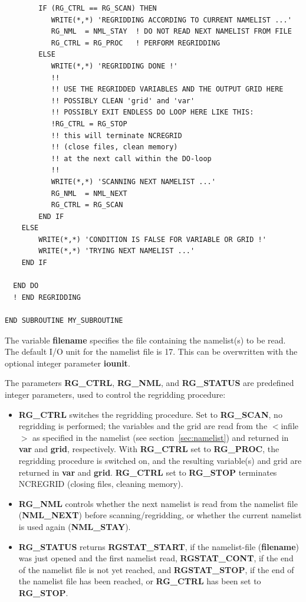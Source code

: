 \documentclass[12pt, a4paper]{article}
\begin{document}
\begin{verbatim}
        IF (RG_CTRL == RG_SCAN) THEN
           WRITE(*,*) 'REGRIDDING ACCORDING TO CURRENT NAMELIST ...'
           RG_NML  = NML_STAY  ! DO NOT READ NEXT NAMELIST FROM FILE
           RG_CTRL = RG_PROC   ! PERFORM REGRIDDING
        ELSE
           WRITE(*,*) 'REGRIDDING DONE !'
           !!
           !! USE THE REGRIDDED VARIABLES AND THE OUTPUT GRID HERE
           !! POSSIBLY CLEAN 'grid' and 'var'
           !! POSSIBLY EXIT ENDLESS DO LOOP HERE LIKE THIS:
           !RG_CTRL = RG_STOP
           !! this will terminate NCREGRID
           !! (close files, clean memory)
           !! at the next call within the DO-loop
           !!
           WRITE(*,*) 'SCANNING NEXT NAMELIST ...'
           RG_NML  = NML_NEXT
           RG_CTRL = RG_SCAN
        END IF
    ELSE
        WRITE(*,*) 'CONDITION IS FALSE FOR VARIABLE OR GRID !'
        WRITE(*,*) 'TRYING NEXT NAMELIST ...'
    END IF

  END DO
  ! END REGRIDDING

END SUBROUTINE MY_SUBROUTINE
\end{verbatim}
%

The variable {\bf filename} specifies the file containing the namelist(s)
to be read. The default I/O unit for the namelist file is 17. This can
be overwritten with the optional integer parameter {\bf iounit}.

The parameters {\bf RG\_CTRL}, {\bf RG\_NML}, and {\bf RG\_STATUS} are
predefined integer parameters, used to control the regridding
procedure:
\begin{itemize}
\item {\bf RG\_CTRL} switches the regridding procedure.
      Set to {\bf RG\_SCAN},
      no regridding is performed; the variables and the grid are read from
      the $<$infile$>$ as specified in the namelist
      (see section~\ref{sec:namelist}) and returned in {\bf var} and
      {\bf grid},
      respectively. With {\bf RG\_CTRL} set to {\bf RG\_PROC},
      the regridding procedure
      is switched on, and the resulting variable(s) and grid are returned in
      {\bf var} and {\bf grid}.
      {\bf RG\_CTRL} set to {\bf RG\_STOP} terminates NCREGRID (closing files,
      cleaning memory).
\item {\bf RG\_NML} controls whether the next namelist is read from the
      namelist file ({\bf NML\_NEXT}) before scanning/regridding, or whether
      the current namelist is used again ({\bf NML\_STAY}).
\item {\bf RG\_STATUS} returns {\bf RGSTAT\_START}, if the namelist-file
      ({\bf filename}) was just opened and the first namelist read,
      {\bf RGSTAT\_CONT}, if the end of the namelist file is not yet reached,
      and {\bf RGSTAT\_STOP}, if the end of the
      namelist file has been reached, or {\bf RG\_CTRL} has been set to
      {\bf RG\_STOP}.
\end{itemize}
\end{document}
